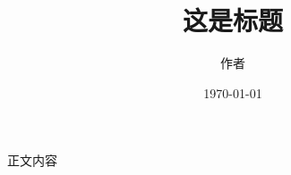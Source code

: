 \documentclass[UTF8]{ctexart}
\title{\heiti 这是标题}
\author{\kaishu 作者}
\date{\today}
\begin{document}
    \maketitle
    \clearpage
    正文内容
\end{document}
